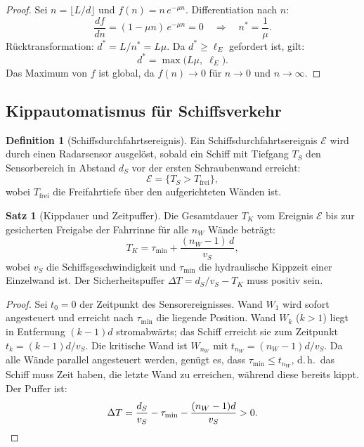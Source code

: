 ﻿\documentclass[a4paper,12pt]{article}
\theoremstyle{definition}
\newtheorem{definition}{Definition}
\newtheorem{satz}{Satz}
\begin{document}
\begin{proof}
Sei $n = \lfloor L/d \rfloor$ und $f(n) = n\,e^{-\mu n}$. Differentiation nach $n$:
\[
  \frac{df}{dn} = (1 - \mu n)\,e^{-\mu n} = 0 \quad\Rightarrow\quad n^* = \frac{1}{\mu}.
\]
Rücktransformation: $d^* = L/n^* = L\mu$. Da $d^* \geq \ell_E$ gefordert ist,
gilt:
\[
  d^* = \max\bigl(L\mu,\; \ell_E\bigr).
\]
Das Maximum von $f$ ist global, da $f(n) \to 0$ für $n \to 0$ und $n \to \infty$. \qedhere
\end{proof}

\subsection{Kippautomatismus für Schiffsverkehr}

\begin{definition}[Schiffsdurchfahrtsereignis]
Ein Schiffsdurchfahrtsereignis $\mathcal{E}$ wird durch einen Radarsensor ausgelöst,
sobald ein Schiff mit Tiefgang $T_S$ den Sensorbereich in Abstand $d_S$ vor der ersten
Schraubenwand erreicht:
\[
  \mathcal{E} = \bigl\{T_S > T_{\mathrm{frei}}\bigr\},
\]
wobei $T_{\mathrm{frei}}$ die Freifahrtiefe über den aufgerichteten Wänden ist.
\end{definition}

\begin{satz}[Kippdauer und Zeitpuffer]
\label{satz:kippdauer}
Die Gesamtdauer $T_K$ vom Ereignis $\mathcal{E}$ bis zur gesicherten Freigabe der
Fahrrinne für alle $n_W$ Wände beträgt:
\[
  T_K = \tau_{\mathrm{min}} + \frac{(n_W - 1)\,d}{v_S},
\]
wobei $v_S$ die Schiffsgeschwindigkeit und $\tau_{\mathrm{min}}$ die hydraulische
Kippzeit einer Einzelwand ist. Der Sicherheitspuffer $\Delta T = d_S/v_S - T_K$
muss positiv sein.
\end{satz}

\begin{proof}
Sei $t_0 = 0$ der Zeitpunkt des Sensorereignisses. Wand $W_1$ wird sofort
angesteuert und erreicht nach $\tau_{\mathrm{min}}$ die liegende Position. Wand
$W_k$ ($k > 1$) liegt in Entfernung $(k-1)d$ stromabwärts; das Schiff erreicht sie
zum Zeitpunkt $t_k = (k-1)d/v_S$. Die kritische Wand ist $W_{n_W}$ mit
$t_{n_W} = (n_W-1)d/v_S$. Da alle Wände parallel angesteuert werden, genügt es,
dass $\tau_{\mathrm{min}} \leq t_{n_W}$, d.\,h.\ das Schiff muss Zeit haben, die letzte
Wand zu erreichen, während diese bereits kippt. Der Puffer ist:
\[
  \Delta T = \frac{d_S}{v_S} - \tau_{\mathrm{min}} - \frac{(n_W-1)d}{v_S} > 0. \qedhere
\]
\end{proof}
\end{document}
